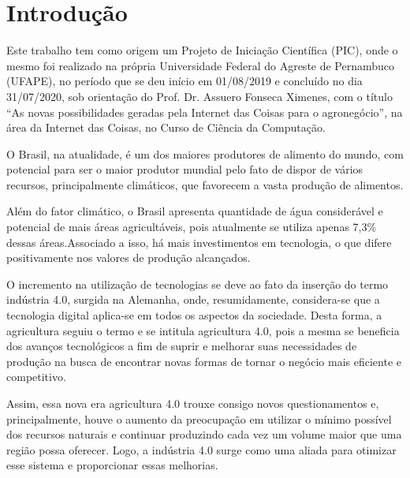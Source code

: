 \documentclass[eso]{bcc}
\begin{document}
\renewcommand\contentsname{\centerline{Sumário}}
\renewcommand\listfigurename{\centerline{Lista de Figuras}}

\tableofcontents

\listoffigures
{}


\newcommand\avisoPIC{
Este trabalho tem como origem um Projeto de Iniciação Científica (PIC), 
onde o mesmo foi realizado na própria Universidade Federal do Agreste de Pernambuco (UFAPE), 
no período que se deu início em 01/08/2019 e concluído no dia 31/07/2020, 
sob orientação do Prof\@. Dr\@. Assuero Fonseca Ximenes, com o título ``As novas 
possibilidades geradas pela Internet das Coisas para o agronegócio'', 
na área da Internet das Coisas, no Curso de Ciência da Computação.
}


\inicio\chapter{Introdução}

\avisoPIC{}

O Brasil, na atualidade, é um dos maiores produtores de alimento do mundo, com potencial para 
ser o maior produtor mundial pelo fato de dispor de vários recursos, principalmente climáticos, 
que favorecem a vasta produção de alimentos.

Além do fator climático, o Brasil apresenta quantidade de água considerável e potencial de 
mais áreas agricultáveis, pois atualmente se utiliza apenas 7,3\% dessas áreas.Associado a isso, 
há mais investimentos em tecnologia, o que difere positivamente nos valores de produção alcançados.

O incremento na utilização de tecnologias se deve ao fato da inserção do termo indústria 4.0, 
surgida na Alemanha, onde, resumidamente, considera-se que a tecnologia digital aplica-se em todos 
os aspectos da sociedade. Desta forma, a agricultura seguiu o termo e se intitula agricultura 4.0, 
pois a mesma se beneficia dos avanços tecnológicos a fim de suprir e melhorar suas necessidades 
de produção na busca de encontrar novas formas de tornar o negócio mais eficiente e competitivo.

Assim, essa nova era agricultura 4.0 trouxe consigo novos questionamentos e, principalmente, 
houve o aumento da preocupação em utilizar o mínimo possível dos recursos naturais e continuar 
produzindo cada vez um volume maior que uma região possa oferecer. Logo, a indústria 4.0 surge 
como uma aliada para otimizar esse sistema e proporcionar essas melhorias.
\end{document}
